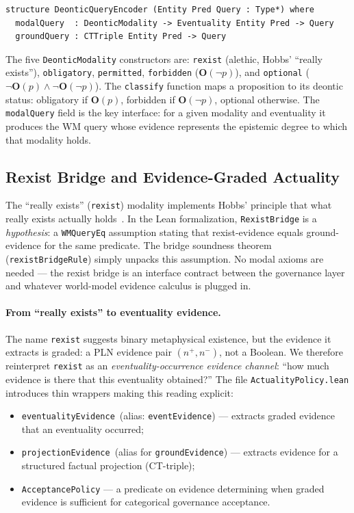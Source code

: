 \documentclass[]{article}
\newcommand{\code}[1]{\texttt{#1}}
\newcommand{\OB}{\ensuremath{\mathbf{O}}}
\newcommand{\PLN}{\textup{PLN}}
\begin{document}
\begin{lstlisting}
structure DeonticQueryEncoder (Entity Pred Query : Type*) where
  modalQuery  : DeonticModality -> Eventuality Entity Pred -> Query
  groundQuery : CTTriple Entity Pred -> Query
\end{lstlisting}

\noindent
The five \code{DeonticModality} constructors are: \code{rexist} (alethic,
Hobbs' ``really exists''), \code{obligatory}, \code{permitted},
\code{forbidden} ($\OB(\neg p)$), and \code{optional} ($\neg\OB(p) \wedge \neg\OB(\neg p)$).
The \code{classify} function maps a proposition to its deontic status:
obligatory if $\OB(p)$, forbidden if $\OB(\neg p)$, optional otherwise.
The \code{modalQuery} field is the key interface: for a given modality and
eventuality it produces the WM query whose evidence represents the epistemic
degree to which that modality holds.

\subsection{Rexist Bridge and Evidence-Graded Actuality}
\label{sec:actuality}

The ``really exists'' (\code{rexist}) modality implements Hobbs' principle
that what really exists actually holds~\cite{Hobbs1985}.  In the Lean formalization,
\code{RexistBridge} is a \emph{hypothesis}: a \code{WMQueryEq} assumption
stating that rexist-evidence equals ground-evidence for the same predicate.
The bridge soundness theorem (\code{rexistBridgeRule}) simply unpacks
this assumption.  No modal axioms are needed --- the rexist bridge is an
interface contract between the governance layer and whatever world-model
evidence calculus is plugged in.

\paragraph{From ``really exists'' to eventuality evidence.}
The name \code{rexist} suggests binary metaphysical existence, but the
evidence it extracts is graded: a \PLN{} evidence pair $(n^+, n^-)$,
not a Boolean.  We therefore reinterpret \code{rexist} as an
\emph{eventuality-occurrence evidence channel}: ``how much evidence is
there that this eventuality obtained?''  The file
\code{ActualityPolicy.lean} introduces thin wrappers making this reading
explicit:
\begin{itemize}
\item \code{eventualityEvidence}~(alias: \code{eventEvidence}) ---
      extracts graded evidence that an eventuality occurred;
\item \code{projectionEvidence}~(alias for \code{groundEvidence}) ---
      extracts evidence for a structured factual projection (CT-triple);
\item \code{AcceptancePolicy} --- a predicate on evidence determining
      when graded evidence is sufficient for categorical governance
      acceptance.
\end{itemize}
\end{document}
